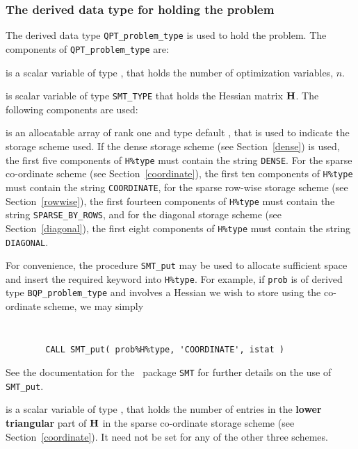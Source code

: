 \documentclass{galahad}
\newcommand{\packagename}{BQP}
\begin{document}

\subsubsection{The derived data type for holding the problem}\label{typeprob}
The derived data type {\tt QPT\_problem\_type} is used to hold 
the problem. The components of 
{\tt QPT\_problem\_type} 
are:

\begin{description}

 is a scalar variable of type \integer, 
 that holds the number of optimization variables, $n$.  
              
 is scalar variable of type {\tt SMT\_TYPE} 
that holds the Hessian matrix ${\mathbf{H}}$. The following components
are used:

\begin{description}

 is an allocatable array of rank one and type default \character, that
is used to indicate the storage scheme used. If the dense storage scheme 
(see Section~\ref{dense}) is used, 
the first five components of {\tt H\%type} must contain the
string {\tt DENSE}.
For the sparse co-ordinate scheme (see Section~\ref{coordinate}), 
the first ten components of {\tt H\%type} must contain the
string {\tt COORDINATE},  
for the sparse row-wise storage scheme (see Section~\ref{rowwise}),
the first fourteen components of {\tt H\%type} must contain the
string {\tt SPARSE\_BY\_ROWS},
and for the diagonal storage scheme (see Section~\ref{diagonal}),
the first eight components of {\tt H\%type} must contain the
string {\tt DIAGONAL}.

For convenience, the procedure {\tt SMT\_put} 
may be used to allocate sufficient space and insert the required keyword
into {\tt H\%type}.
For example, if {\tt prob} is of derived type {\tt \packagename\_problem\_type}
and involves a Hessian we wish to store using the co-ordinate scheme,
we may simply
{\tt 
\begin{verbatim}
        CALL SMT_put( prob%H%type, 'COORDINATE', istat )
\end{verbatim}
}
\noindent
See the documentation for the \galahad\ package {\tt SMT} 
for further details on the use of {\tt SMT\_put}.

 is a scalar variable of type \integer, that 
holds the number of entries in the {\bf lower triangular} part of ${\mathbf{H}}$
in the sparse co-ordinate storage scheme (see Section~\ref{coordinate}). 
It need not be set for any of the other three schemes.


\end{description}
\end{description}
\end{document}
